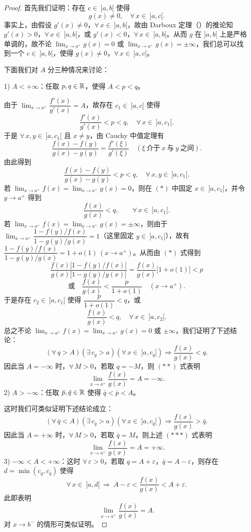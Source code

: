\begin{proof}

	首先我们证明：存在 \(c\in\ ]a,b[\) 使得
	\[
	g(x)\neq0,\quad\forall\,x\in\ ]a,c[.
	\]
	事实上，由假设 \(g'(x)\neq0\)，\(\forall\,x\in\ ]a,b[\)，故由 Darboux 定理（）的推论知 \(g'(x)>0\)，\(\forall\,x\in\ ]a,b[\)，或 \(g'(x)<0\)，\(\forall\,x\in\ ]a,b[\)。从而 \(g\) 在 \(]a,b[\) 上是严格单调的，故不论 \(\lim_{x\to a^+}g(x)=0\) 或 \(\lim_{x\to a^+}g(x)=\pm\infty\)，我们总可以找到一个 \(c\in\ ]a,b[\)，使得 \(g(x)\neq0\)，\(\forall\,x\in\ ]a,c[\)。

	下面我们对 \(A\) 分三种情况来讨论：

	1) \(A<+\infty\)：任取 \(p,q\in\mathbb{R}\)，使得 \(A<p<q\)。

	由于 \(\lim_{x\to a^+}\dfrac{f'(x)}{g'(x)}=A\)，故存在 \(c_1\in\ ]a,c[\) 使得
	\[
	\frac{f'(x)}{g'(x)}<p<q,\quad\forall\,x\in\ ]a,c_1[.
	\]
	于是 \(\forall\,x,y\in\ ]a,c_1[\) 且 \(x\neq y\)，由 Cauchy 中值定理有
	\[
	\frac{f(x)-f(y)}{g(x)-g(y)}=\frac{f'(\xi)}{g'(\xi)}\quad(\xi\ \text{介于}\ x\ \text{与}\ y\ \text{之间}).
	\]
	由此得到
	\[
	\frac{f(x)-f(y)}{g(x)-g(y)}<p<q,\quad\forall\,x,y\in\ ]a,c_1[. \tag{*}
	\]
	若 \(\lim_{x\to a^+}f(x)=\lim_{x\to a^+}g(x)=0\)，则在 \((*)\) 中固定 \(x\in\ ]a,c_1[\)，并令 \(y\to a^+\) 得到
	\[
	\frac{f(x)}{g(x)}<q,\qquad\forall\,x\in\ ]a,c_1[.
	\]
	若 \(\lim_{x\to a^+}f(x)=\lim_{x\to a^+}g(x)=\pm\infty\)，则由于 \(\lim_{x\to a^+}\dfrac{1-f(y)/f(x)}{1-g(y)/g(x)}=1\)（这里固定 \(y\in\ ]a,c_1[\)），故有 \(\dfrac{1-f(y)/f(x)}{1-g(y)/g(x)}=1+o(1)\ (x\to a^+)\)。从而由 \((*)\) 式得到
	\[
	\frac{f(x)\bigl[1-f(y)/f(x)\bigr]}{g(x)\bigl[1-g(y)/g(x)\bigr]}=\frac{f(x)}{g(x)}\bigl[1+o(1)\bigr]<p
	\]
	\[
	\text{或}\quad\frac{f(x)}{g(x)}<\frac{p}{1+o(1)}\quad(x\to a^+).
	\]
	于是存在 \(c_2\in\ ]a,c_1[\) 使得 \(\dfrac{p}{1+o(1)}<q\)，或
	\[
	\frac{f(x)}{g(x)}<q,\quad\forall\,x\in\ ]a,c_2[.
	\]
	总之不论 \(\lim_{x\to a^+}f(x)=\lim_{x\to a^+}g(x)=0\) 或 \(\pm\infty\)，我们证明了下述结论：
	\[
	(\forall\,q>A)(\exists\,c_q>a)(\forall\,x\in\ ]a,c_q[)\Longrightarrow\frac{f(x)}{g(x)}<q. \tag{**}
	\]
	因此当 \(A=-\infty\) 时，\(\forall\,M>0\)，若取 \(q=-M\)，则 \((**)\) 式表明
	\[
	\lim_{x\to a^+}\frac{f(x)}{g(x)}=A=-\infty.
	\]
	2) \(A>-\infty\)：任取 \(\bar p,\bar q\in\mathbb{R}\) 使得 \(\bar q<\bar p<A\)。

	这时我们可类似证明下述结论成立：
	\[
	(\forall\,\bar q<A)(\exists\,c_{\bar q}>a)(\forall\,x\in\ ]a,c_{\bar q}[)\Longrightarrow\frac{f(x)}{g(x)}>\bar q. \tag{***}
	\]
	因此当 \(A=+\infty\) 时，\(\forall\,M>0\)，若取 \(\bar q=M\)，则上述 \((***)\) 式表明
	\[
	\lim_{x\to a^+}\frac{f(x)}{g(x)}=A=+\infty.
	\]
	3) \(-\infty<A<+\infty\)：这时 \(\forall\,\varepsilon>0\)，若取 \(q=A+\varepsilon\)，\(\bar q=A-\varepsilon\)，则存在 \(d=\min(c_q,c_{\bar q})\) 使得
	\[
	\forall\,x\in\ ]a,d[\ \Longrightarrow\ A-\varepsilon<\frac{f(x)}{g(x)}<A+\varepsilon.
	\]
	此即表明
	\[
	\lim_{x\to a^+}\frac{f(x)}{g(x)}=A.
	\]
	对 \(x\to b^-\) 的情形可类似证明。

\end{proof}

